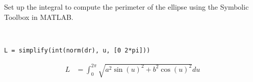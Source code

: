 Set up the integral to compute the perimeter of the ellipse using the Symbolic Toolbox in MATLAB.

\begin{solution} \
\begin{lstlisting}
L = simplify(int(norm(dr), u, [0 2*pi]))
\end{lstlisting}

\begin{align*}
    L &= \int_{0}^{2 \pi} \sqrt{a^{2}\sin (u)^{2}+b^{2}\cos (u)^{2}} du
\end{align*}
\end{solution}